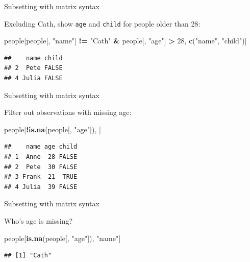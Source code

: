 \documentclass[ignorenonframetext,]{beamer}
\newenvironment{Shaded}{\begin{snugshade}}{\end{snugshade}}
\newcommand{\DecValTok}[1]{\textcolor[rgb]{0.00,0.00,0.81}{#1}}
\newcommand{\KeywordTok}[1]{\textcolor[rgb]{0.13,0.29,0.53}{\textbf{#1}}}
\newcommand{\NormalTok}[1]{#1}
\newcommand{\OperatorTok}[1]{\textcolor[rgb]{0.81,0.36,0.00}{\textbf{#1}}}
\newcommand{\StringTok}[1]{\textcolor[rgb]{0.31,0.60,0.02}{#1}}
\begin{document}
\begin{frame}[fragile]{Subsetting with matrix syntax}
\protect\hypertarget{subsetting-with-matrix-syntax-6}{}

Excluding Cath, show \texttt{age} and \texttt{child} for people older
than 28:

\begin{Shaded}
\begin{Highlighting}[]
\NormalTok{people[people[, }\StringTok{"name"}\NormalTok{] }\OperatorTok{!=}\StringTok{ "Cath"} \OperatorTok{&}\StringTok{ }
\StringTok{       }\NormalTok{people[, }\StringTok{"age"}\NormalTok{] }\OperatorTok{>}\StringTok{ }\DecValTok{28}\NormalTok{,}
  \KeywordTok{c}\NormalTok{(}\StringTok{"name"}\NormalTok{, }\StringTok{"child"}\NormalTok{)]}
\end{Highlighting}
\end{Shaded}

\begin{verbatim}
##    name child
## 2  Pete FALSE
## 4 Julia FALSE
\end{verbatim}

\end{frame}

\begin{frame}[fragile]{Subsetting with matrix syntax}
\protect\hypertarget{subsetting-with-matrix-syntax-7}{}

Filter out observations with missing age:

\begin{Shaded}
\begin{Highlighting}[]
\NormalTok{people[}\OperatorTok{!}\KeywordTok{is.na}\NormalTok{(people[, }\StringTok{"age"}\NormalTok{]), ]}
\end{Highlighting}
\end{Shaded}

\begin{verbatim}
##    name age child
## 1  Anne  28 FALSE
## 2  Pete  30 FALSE
## 3 Frank  21  TRUE
## 4 Julia  39 FALSE
\end{verbatim}

\end{frame}

\begin{frame}[fragile]{Subsetting with matrix syntax}
\protect\hypertarget{subsetting-with-matrix-syntax-8}{}

Who's age is missing?

\begin{Shaded}
\begin{Highlighting}[]
\NormalTok{people[}\KeywordTok{is.na}\NormalTok{(people[, }\StringTok{"age"}\NormalTok{]), }\StringTok{"name"}\NormalTok{]}
\end{Highlighting}
\end{Shaded}

\begin{verbatim}
## [1] "Cath"
\end{verbatim}

\end{frame}
\end{document}
